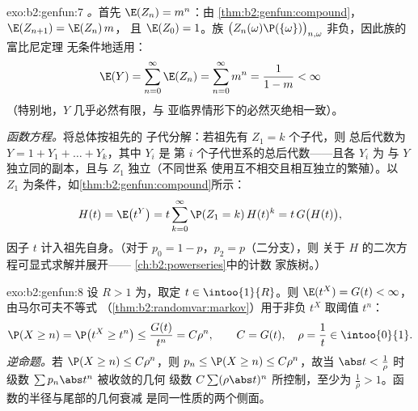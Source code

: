 \begin{solution}{exo:b2:genfun:7}
\emph{。}首先 $\E(Z_n) = m^n$：由
\cref{thm:b2:genfun:compound}，$\E(Z_{n+1}) = \E(Z_n)\,m$，
且 $\E(Z_0) = 1$。族 $\bigl(Z_n(\omega)\P(\{\omega\})
\bigr)_{n, \omega}$ 非负，因此族的富比尼定理
无条件地适用：
\[
\E(Y) = \sum_{n=0}^{\infty}\E(Z_n)
= \sum_{n=0}^\infty m^n = \frac{1}{1 - m} < \infty
\]
（特别地，$Y$ 几乎必然有限，与
亚临界情形下的必然灭绝相一致）。

\emph{函数方程。}将总体按祖先的
子代分解：若祖先有 $Z_1 = k$ 个子代，则
总后代数为 $Y = 1 + Y_1 + \dots + Y_k$，其中 $Y_i$ 是
第 $i$ 个子代世系的总后代数——且各 $Y_i$ 为
与 $Y$ 独立同的副本，且与 $Z_1$ 独立（不同世系
使用互不相交且相互独立的繁殖）。以
$Z_1$ 为条件，如\cref{thm:b2:genfun:compound}所示：
\[
H(t) = \E\bigl(t^Y\bigr)
= t\sum_{k=0}^\infty \P(Z_1 = k)\,H(t)^k
= t\,G\bigl(H(t)\bigr),
\]
因子 $t$ 计入祖先自身。（对于
 $p_0 = 1 - p$，$p_2 = p$（二分支），则
关于 $H$ 的二次方程可显式求解并展开——
\cref{ch:b2:powerseries}中的计数
家族树。）
\end{solution}

\begin{solution}{exo:b2:genfun:8}
设 $R > 1$ 为，取定 $t \in \intoo{1}{R}$。则
$\E(t^X) = G(t) < \infty$，由马尔可夫不等式
（\cref{thm:b2:randomvar:markov}）用于非负
 $t^X$ 取阈值 $t^n$：
\[
\P(X \geq n) = \P\bigl(t^X \geq t^n\bigr)
\leq \frac{G(t)}{t^n} = C\rho^n,
\qquad C = G(t),\quad \rho = \frac1t \in \intoo{0}{1}.
\]
\emph{逆命题。}若 $\P(X \geq n) \leq C\rho^n$，则 $p_n \leq
\P(X \geq n) \leq C\rho^n$，故当 $\abs t < \frac1\rho$ 时
级数 $\sum p_n\abs t^n$ 被收敛的几何
级数 $C\sum(\rho\abs t)^n$ 所控制，至少为
$\frac1\rho > 1$。函数的半径与尾部的几何衰减
是同一性质的两个侧面。
\end{solution}

